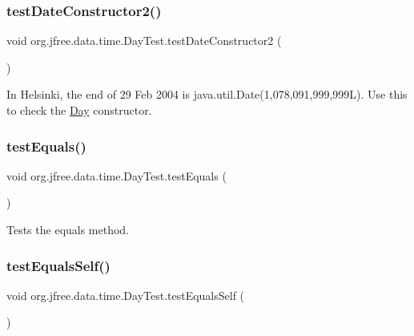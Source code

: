 \subsubsection{\texorpdfstring{test\+Date\+Constructor2()}{testDateConstructor2()}}
{\footnotesize\ttfamily void org.\+jfree.\+data.\+time.\+Day\+Test.\+test\+Date\+Constructor2 (\begin{DoxyParamCaption}{ }\end{DoxyParamCaption})}

In Helsinki, the end of 29 Feb 2004 is java.\+util.\+Date(1,078,091,999,999\+L). Use this to check the \mbox{\hyperlink{classorg_1_1jfree_1_1data_1_1time_1_1_day}{Day}} constructor. \mbox{\label{classorg_1_1jfree_1_1data_1_1time_1_1_day_test_ac28c4bdfbbacb739002214f523ad8388}} 
\subsubsection{\texorpdfstring{test\+Equals()}{testEquals()}}
{\footnotesize\ttfamily void org.\+jfree.\+data.\+time.\+Day\+Test.\+test\+Equals (\begin{DoxyParamCaption}{ }\end{DoxyParamCaption})}

Tests the equals method. \mbox{\label{classorg_1_1jfree_1_1data_1_1time_1_1_day_test_a19252a7f6e619498e28ec562bef2591f}} 
\subsubsection{\texorpdfstring{test\+Equals\+Self()}{testEqualsSelf()}}
{\footnotesize\ttfamily void org.\+jfree.\+data.\+time.\+Day\+Test.\+test\+Equals\+Self (\begin{DoxyParamCaption}{ }\end{DoxyParamCaption})}

